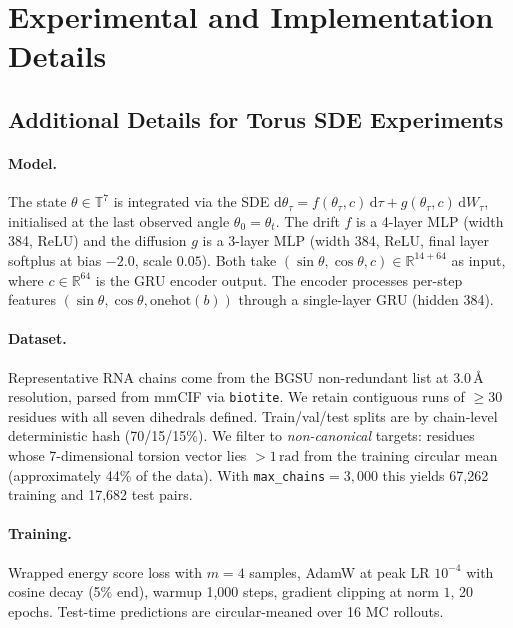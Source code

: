 \documentclass{article}
\theoremstyle{definition}
\theoremstyle{remark}
\begin{document}
\section{Experimental and Implementation Details}

\subsection{Additional Details for Torus SDE Experiments}
\label{app:torus_details}

\paragraph{Model.}
The state $\theta \in \mathbb{T}^{7}$ is integrated via the SDE
$\mathrm{d}\theta_\tau = f(\theta_\tau, c)\,\mathrm{d}\tau + g(\theta_\tau, c)\,\mathrm{d}W_\tau$,
initialised at the last observed angle $\theta_0 = \theta_t$.
The drift $f$ is a 4-layer MLP (width 384, ReLU) and the diffusion $g$ is a 3-layer MLP
(width 384, ReLU, final layer softplus at bias $-2.0$, scale $0.05$).
Both take $(\sin\theta, \cos\theta, c) \in \mathbb{R}^{14 + 64}$ as input, where
$c \in \mathbb{R}^{64}$ is the GRU encoder output.
The encoder processes per-step features $(\sin\theta, \cos\theta, \mathrm{onehot}(b))$
through a single-layer GRU (hidden 384).

\paragraph{Dataset.}
Representative RNA chains come from the BGSU non-redundant list at $3.0\,$\AA{} resolution,
parsed from mmCIF via \texttt{biotite}.
We retain contiguous runs of $\geq 30$ residues with all seven dihedrals defined.
Train/val/test splits are by chain-level deterministic hash (70/15/15\%).
We filter to \emph{non-canonical} targets: residues whose 7-dimensional torsion vector
lies $> 1\,\mathrm{rad}$ from the training circular mean (approximately 44\% of the data).
With \texttt{max\_chains}$= 3{,}000$ this yields 67{,}262 training and 17{,}682 test pairs.

\paragraph{Training.}
Wrapped energy score loss with $m = 4$ samples, AdamW at peak LR $10^{-4}$ with
cosine decay (5\% end), warmup 1{,}000 steps, gradient clipping at norm $1$, 20 epochs.
Test-time predictions are circular-meaned over 16 MC rollouts.
\end{document}
